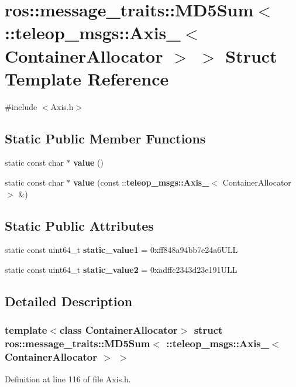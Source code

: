 \section{ros::message\_\-traits::MD5Sum$<$ ::teleop\_\-msgs::Axis\_\-$<$ ContainerAllocator $>$ $>$ Struct Template Reference}
\label{structros_1_1message__traits_1_1MD5Sum_3_01_1_1teleop__msgs_1_1Axis___3_01ContainerAllocator_01_4_01_4}


{\ttfamily \#include $<$Axis.h$>$}

\subsection*{Static Public Member Functions}
\begin{DoxyCompactItemize}
\item 
static const char $\ast$ {\bf value} ()
\item 
static const char $\ast$ {\bf value} (const ::{\bf teleop\_\-msgs::Axis\_\-}$<$ ContainerAllocator $>$ \&)
\end{DoxyCompactItemize}
\subsection*{Static Public Attributes}
\begin{DoxyCompactItemize}
\item 
static const uint64\_\-t {\bf static\_\-value1} = 0xff848a94bb7e24a6ULL
\item 
static const uint64\_\-t {\bf static\_\-value2} = 0xadffc2343d23e191ULL
\end{DoxyCompactItemize}


\subsection{Detailed Description}
\subsubsection*{template$<$class ContainerAllocator$>$ struct ros::message\_\-traits::MD5Sum$<$ ::teleop\_\-msgs::Axis\_\-$<$ ContainerAllocator $>$ $>$}



Definition at line 116 of file Axis.h.



